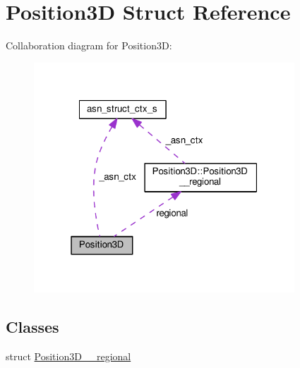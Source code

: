 \hypertarget{structPosition3D}{}\section{Position3D Struct Reference}
\label{structPosition3D}


Collaboration diagram for Position3D\+:\nopagebreak
\begin{figure}[H]
\begin{center}
\leavevmode
\includegraphics[width=277pt]{structPosition3D__coll__graph}
\end{center}
\end{figure}
\subsection*{Classes}
\begin{DoxyCompactItemize}
\item 
struct \hyperlink{structPosition3D_1_1Position3D____regional}{Position3\+D\+\_\+\+\_\+regional}
\end{DoxyCompactItemize}
